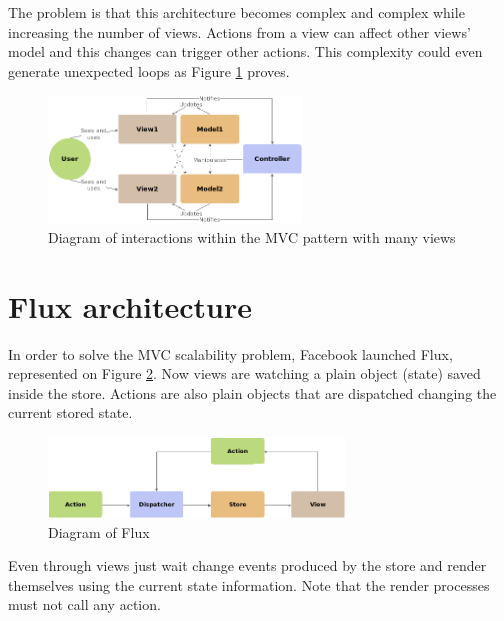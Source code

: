 The problem is that this architecture becomes complex and complex while 
increasing the number of views. Actions from a view can affect other views'
model and this changes can trigger other actions. This complexity could even
generate unexpected loops as Figure \ref{F:mvc-complex} proves.

\begin{figure}[htb]
	\begin{center}
		\includegraphics[width=0.6\textwidth]{./figures/mvc-complex.png}
		\caption{Diagram of interactions within the MVC pattern with many views}
		\label{F:mvc-complex}
	\end{center}
\end{figure}

\section{Flux architecture}

In order to solve the MVC scalability problem, Facebook launched Flux, represented
on Figure \ref{F:flux}. Now views are watching a plain object (state) saved
inside the store. Actions are also plain objects that are dispatched changing
the current stored state.

\begin{figure}[htb]
	\begin{center}
		\includegraphics[width=0.7\textwidth]{./figures/flux.png}
		\caption{Diagram of Flux}
		\label{F:flux}
	\end{center}
\end{figure}

Even through views just wait change events produced by the store and render
themselves using the current state information. Note that the render processes
must not call any action.

